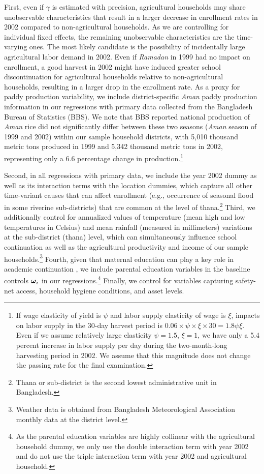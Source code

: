 \documentclass[12pt,letterpaper]{article}
\newcommand{\bfomega}{\ensuremath{\mbox{\boldmath $\omega$}}}
\newcommand{\0}{\ensuremath{\mbox{\boldmath $0$}}}
\begin{document}
First, even if $\gamma$ is estimated with precision, agricultural households may share unobservable characteristics that result in a larger decrease in enrollment rates in 2002 compared to non-agricultural households. As we are controlling for individual fixed effects, the remaining unobservable characteristics are the time-varying ones. The most likely candidate is the possibility of incidentally large agricultural labor demand in 2002. Even if \textit{Ramadan} in 1999 had no impact on enrollment, a good harvest in 2002 might have induced greater school discontinuation for agricultural households relative to non-agricultural households, resulting in a larger drop in the enrollment rate. As a proxy for paddy production variability, we include district-specific \textit{Aman} paddy production information in our regressions with primary data collected from the Bangladesh Bureau of Statistics (BBS). We note that BBS reported national production of \textit{Aman} rice did not significantly differ between these two seasons (\textit{Aman} season of 1999 and 2002) within our sample household districts, with 5,010 thousand metric tons produced in 1999 and 5,342 thousand metric tons in 2002, representing only a 6.6 percentage change in production.\footnote{If wage elasticity of yield is $\psi$ and labor supply elasticity of wage is $\xi$, impacts on labor supply in the 30-day harvest period is $0.06\times\psi\times\xi\times 30 = 1.8\psi\xi$. Even if we assume relatively large elasticity $\psi = 1.5$, $\xi=1$, we have only a 5.4 percent increase in labor supply per day during the two-month-long harvesting period in 2002. We assume that this magnitude does not change the passing rate for the final examination. } 

Second, in all regressions with primary data, we include the year 2002 dummy as well as its interaction terms with the location dummies, which capture all other time-variant causes that can affect enrollment (e.g., occurrence of seasonal flood in some riverine sub-districts) that are common at the level of thana.\footnote{Thana or sub-district is the second lowest administrative unit in Bangladesh. } Third, we additionally control for annualized values of temperature (mean high and low temperatures in Celsius) and mean rainfall (measured in millimeters) variations at the sub-district (thana) level, which can simultaneously influence school continuation as well as the agricultural productivity and income of our sample households.\footnote{Weather data is obtained from Bangladesh Meteorological Association monthly data at the district level.} Fourth, given that maternal education can play a key role in academic continuation \citep{BFRV1999}, we include parental education variables in the baseline controls $\bfomega_{i}$ in our regressions.\footnote{As the parental education variables are highly collinear with the agricultural household dummy, we only use the double interaction term with year 2002 and do not use the triple interaction term with year 2002 and agricultural household. } Finally, we control for variables capturing safety-net access, household hygiene conditions, and asset levels.
\end{document}
